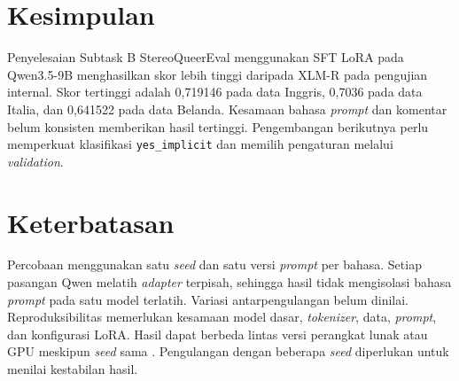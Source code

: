 \documentclass[11pt]{article}
\begin{document}
\section{Kesimpulan}
Penyelesaian Subtask B StereoQueerEval menggunakan SFT LoRA pada Qwen3.5-9B menghasilkan skor lebih tinggi daripada XLM-R pada pengujian internal. Skor tertinggi adalah 0,719146 pada data Inggris, 0,7036 pada data Italia, dan 0,641522 pada data Belanda. Kesamaan bahasa \textit{prompt} dan komentar belum konsisten memberikan hasil tertinggi. Pengembangan berikutnya perlu memperkuat klasifikasi \texttt{yes\_implicit} dan memilih pengaturan melalui \textit{validation}.

\section*{Keterbatasan}
Percobaan menggunakan satu \textit{seed} dan satu versi \textit{prompt} per bahasa. Setiap pasangan Qwen melatih \textit{adapter} terpisah, sehingga hasil tidak mengisolasi bahasa \textit{prompt} pada satu model terlatih. Variasi antarpengulangan belum dinilai. Reproduksibilitas memerlukan kesamaan model dasar, \textit{tokenizer}, data, \textit{prompt}, dan konfigurasi LoRA. Hasil dapat berbeda lintas versi perangkat lunak atau GPU meskipun \textit{seed} sama \citep{pytorch-reproducibility}. Pengulangan dengan beberapa \textit{seed} diperlukan untuk menilai kestabilan hasil.

\clearpage

\end{document}
